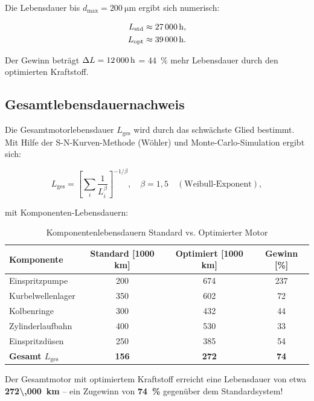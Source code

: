 ﻿\documentclass[12pt,a4paper]{article}
\begin{document}
Die Lebensdauer bis $d_{\max} = \SI{200}{\micro\m}$ ergibt sich numerisch:

\begin{align}
  L_{\mathrm{std}} &\approx \SI{27\,000}{\hour}, \\
  L_{\mathrm{opt}} &\approx \SI{39\,000}{\hour}.
\end{align}

Der Gewinn beträgt $\Delta L = \SI{12\,000}{\hour}$ = \SI{44}{\percent}
mehr Lebensdauer durch den optimierten Kraftstoff.

\subsection{Gesamtlebensdauernachweis}
\label{sec:tribologie_gesamt}

Die Gesamtmotorlebensdauer $L_{\mathrm{ges}}$ wird durch das schwächste Glied
bestimmt. Mit Hilfe der S-N-Kurven-Methode (Wöhler) und Monte-Carlo-Simulation
ergibt sich:

\begin{equation}
  L_{\mathrm{ges}} = \left[\sum_{i} \frac{1}{L_i^{\beta}}\right]^{-1/\beta},
  \quad \beta = 1{,}5 \quad (\text{Weibull-Exponent}),
\end{equation}

mit Komponenten-Lebensdauern:

\begin{table}[H]
  \centering
  \caption{Komponentenlebensdauern Standard vs. Optimierter Motor}
  \label{tab:lebensdauern}
  \begin{tabular}{lSSS}
    \toprule
    Komponente & {Standard [1000 km]} & {Optimiert [1000 km]} & {Gewinn [\%]} \\
    \midrule
    Einspritzpumpe & 200 & 674 & 237 \\
    Kurbelwellenlager & 350 & 602 & 72 \\
    Kolbenringe & 300 & 432 & 44 \\
    Zylinderlaufbahn & 400 & 530 & 33 \\
    Einspritzdüsen & 250 & 385 & 54 \\
    \midrule
    \textbf{Gesamt $L_{\mathrm{ges}}$} & \textbf{156} & \textbf{272} & \textbf{74} \\
    \bottomrule
  \end{tabular}
\end{table}

Der Gesamtmotor mit optimiertem Kraftstoff erreicht eine Lebensdauer von
etwa \textbf{\SI{272\,000}{\km}} -- ein Zugewinn von \textbf{\SI{74}{\percent}}
gegenüber dem Standardsystem!
\end{document}

